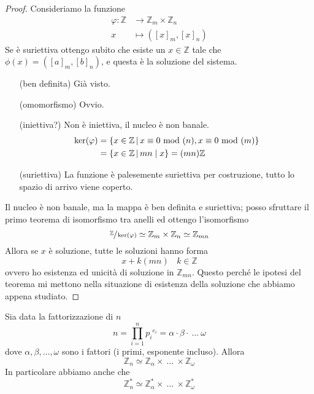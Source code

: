 \begin{proof}
	Consideriamo la funzione 
	\begin{align*}
	\varphi:\mathbb{Z}&\longrightarrow\mathbb{Z}_m\times\mathbb{Z}_n\\
	x&\longmapsto\left([x]_m,[x]_n\right)
	\end{align*}
	Se è suriettiva ottengo subito che esiste un $x\in\mathbb{Z}$ tale che $\phi(x)=\left([a]_m,[b]_n\right)$, e questa è la soluzione del sistema.
	\begin{itemize}
		\item[(ben definita)] Già visto.
		\item[(omomorfismo)] Ovvio.
		\item[(iniettiva?)] Non è iniettiva, il nucleo è non banale.
		\begin{align*}
		\ker(\varphi)&=\left\{x\in\mathbb{Z} \, \middle| \, x\equiv 0 \ \mathrm{mod}\ (n),x \equiv 0 \ \mathrm{mod}\ (m)\right\}\\
		&=\left\{x\in\mathbb{Z} \, \middle| \, mn
		\mid x\right\}=(mn)\mathbb{Z}
		\end{align*}
		\item[(suriettiva)]
		La funzione è palesemente suriettiva per costruzione, tutto lo spazio di arrivo viene coperto.
	\end{itemize}
	Il nucleo è non banale, ma la mappa è ben definita e suriettiva; posso sfruttare il primo teorema di isomorfismo tra anelli ed ottengo l'isomorfismo
	\begin{equation*}
	\sfrac{\mathbb{Z}}{\ker(\varphi)}\simeq\mathbb{Z}_m\times\mathbb{Z}_n\simeq\mathbb{Z}_{mn}
	\end{equation*}
	Allora se $x$ è soluzione, tutte le soluzioni hanno forma 
	\begin{equation*}
	x+k(mn) \ \ \ \ k\in\mathbb{Z}
	\end{equation*}
	ovvero ho esistenza ed unicità di soluzione in $\mathbb{Z}_{mn}$. Questo perché le ipotesi del teorema mi mettono nella situazione di esistenza della soluzione che abbiamo appena studiato.
\end{proof}
\begin{proposizione}
	Sia data la fattorizzazione di $n$
	\begin{equation*}
	n=\prod_{i=1}^{n}{p_i}^{{e_i}}=\alpha\cdot\beta\cdot\ \dots \ \omega
	\end{equation*}
	dove $\alpha,\beta,\dots,\omega$ sono i fattori (i primi, esponente incluso). Allora 
	\begin{equation*}
	\mathbb{Z}_n\simeq\mathbb{Z}_{\alpha}\times\ \dots \ \times\mathbb{Z}_{\omega}
	\end{equation*}
	In particolare abbiamo anche che 
	\begin{equation*}
	\mathbb{Z}_n^*\simeq\mathbb{Z}_{\alpha}^*\times\ \dots \ \times\mathbb{Z}_{\omega}^*
	\end{equation*}
\end{proposizione}
